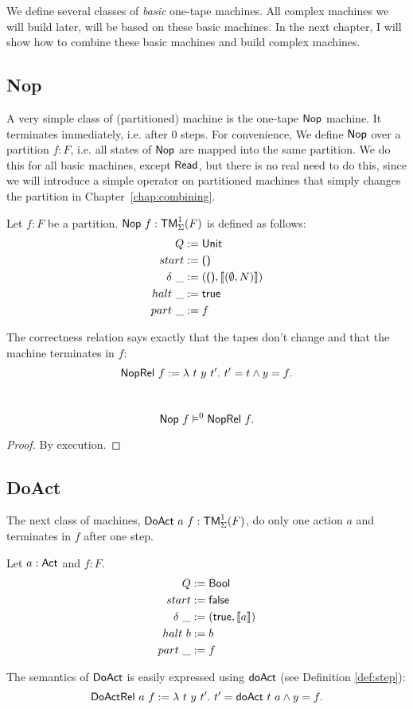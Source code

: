 We define several classes of \emph{basic} one-tape machines.  All complex machines we will build later, will be based on these basic machines.  In the
next chapter, I will show how to combine these basic machines and build complex machines.


\subsection{Nop}
\label{sec:basic_machines-Nop}

A very simple class of (partitioned) machine is the one-tape $\textsf{Nop}$ machine.  It terminates immediately, i.e. after 0 steps.  For convenience, We
define $\textsf{Nop}$ over a partition $f:F$, i.e. all states of $\textsf{Nop}$ are mapped into the same partition.  We do this for all basic machines, except
$\textsf{Read}$, but there is no real need to do this, since we will introduce a simple operator on partitioned machines that simply changes the partition
in Chapter~\ref{chap:combining}.
\begin{definition}[Nop]
  \label{def:Nop}
  Let $f:F$ be a partition.  $\textsf{Nop}~f: \textsf{TM}_\Sigma^1(F)$ is defined as follows:
  \begin{align*}
    Q          &:= \textsf{Unit} \\
    start      &:= \textsf{()} \\
    \delta ~\_ &:= (\textsf{()}, \left\llbracket (\emptyset, N) \right\rrbracket) \\
    halt   ~\_ &:= \textsf{true} \\
    part   ~\_ &:= f
  \end{align*}
\end{definition}
The correctness relation says exactly that the tapes don't change and that the machine terminates in $f$:
\[
  \textsf{NopRel}~f := \lambda~t~y~t'.~ t' = t \land y = f.
\]
\begin{lemma}
  \label{lem:Nop_Sem}
  ~
  \[
    \textsf{Nop}~f \vDash^0 \textsf{NopRel}~f.
  \]
\end{lemma}
\begin{proof}
  By execution.
\end{proof}

\subsection{DoAct}
\label{sec:DoAct}

The next class of machines, $\textsf{DoAct}~a~f : \textsf{TM}_\Sigma^1(F)$, do only one action $a$ and terminates in $f$ after one step.
\begin{definition}[$\MS{DoAct}~a~f$]
  \label{def:DoAct}
  Let $a:\textsf{Act}$ and $f:F$.
  \begin{align*}
    Q          &:= \textsf{Bool} \\
    start      &:= \textsf{false} \\
    \delta ~\_ &:= (\textsf{true}, \left\llbracket a \right\rrbracket) \\
    halt   ~ b &:= b \\
    part   ~\_ &:= f
  \end{align*}
\end{definition}
The semantics of $\textsf{DoAct}$ is easily expressed using $\textsf{doAct}$ (see Definition \ref{def:step}):
\[
  \textsf{DoActRel}~a~f := \lambda~t~y~t'.~ t' = \textsf{doAct}~t~a \land y = f.
\]

